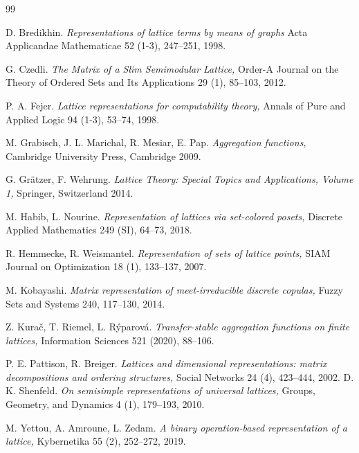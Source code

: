 \documentclass[a4paper]{article} %
\begin{document}
\begin{thebibliography}{99}


D. Bredikhin.
\newblock \emph{Representations of lattice terms by means of graphs}
\newblock Acta Applicandae Mathematicae 52 (1-3), 247–251, 1998.

 G. Czedli. \newblock \emph{The Matrix of a Slim Semimodular Lattice,} \newblock Order-A Journal on the Theory of Ordered Sets and Its Applications 29 (1), 85–103, 2012. 


 P. A. Fejer. \newblock \emph{Lattice representations for computability theory,} \newblock Annals of Pure and Applied Logic 94 (1-3), 53–74, 1998.

 M. Grabisch, J. L. Marichal, R. Mesiar, E. Pap. \newblock \emph{Aggregation functions,} \newblock Cambridge University Press, Cambridge 2009.

 G. Gr\"{a}tzer, F. Wehrung. \newblock \emph{Lattice Theory: Special Topics and Applications, Volume 1,} \newblock Springer, Switzerland 2014.


 M. Habib, L. Nourine. \newblock \emph{Representation of lattices via set-colored posets,} \newblock Discrete Applied Mathematics 249 (SI), 64–73, 2018.

 R. Hemmecke, R. Weismantel. \newblock \emph{Representation of sets of lattice points,} \newblock SIAM Journal on Optimization 18 (1), 133–137, 2007.

 M. Kobayashi. \newblock \emph{Matrix representation of meet-irreducible discrete copulas,} \newblock Fuzzy Sets and Systems 240, 117–130, 2014.

 Z. Kura\v{c}, T. Riemel, L. R\'{y}parov\'{a}. \newblock \emph{Transfer-stable aggregation functions on finite lattices,} \newblock Information Sciences 521 (2020), 88–106. 

 P. E. Pattison, R. Breiger. \newblock \emph{Lattices and dimensional representations: matrix decompositions and ordering structures,} \newblock Social Networks 24 (4), 423–444, 2002.  D. K. Shenfeld. \newblock \emph{On semisimple representations of universal lattices,} \newblock Groups, Geometry, and Dynamics 4 (1), 179–193, 2010.


 M. Yettou, A. Amroune, L. Zedam. \newblock \emph{A binary operation-based representation of a lattice,} \newblock Kybernetika 55 (2), 252–272, 2019.

\end{thebibliography}
\end{document}
